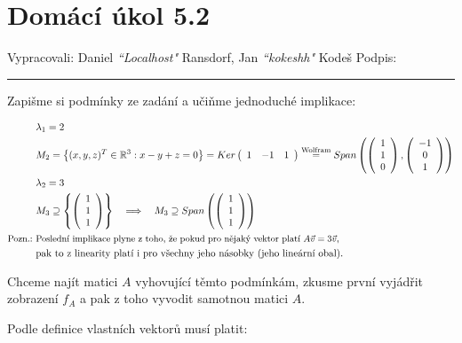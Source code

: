 \documentclass[12pt]{article}
\begin{document}
\section*{Domácí úkol 5.2}

Vypracovali: Daniel \textit{``Localhost"} Ransdorf, Jan \textit{``kokeshh"} Kodeš \hfill Podpis: \rule{4cm}{0.4pt}


\bigskip

Zapišme si podmínky ze zadání a učiňme jednoduché implikace:

\begin{align*}
  &\lambda_1 = 2 \\
  &M_2 = \left\{(x,y,z)^T \in \mathbb{R}^3 : x-y+z=0\right\} = Ker\left(\begin{array}{ccc}
    1&-1&1
  \end{array}\right) \overset{\text{Wolfram}}{=} Span\left(\left(\begin{array}{c}
    1\\1\\0
  \end{array}\right),\left(\begin{array}{c}
    -1\\0\\1
  \end{array}\right)\right) \\
  &\lambda_2 = 3 \\
  &M_3 \supseteq \left\{\left(\begin{array}{c}
    1\\1\\1
  \end{array}\right)\right\}
  \quad \Longrightarrow \quad
  M_3 \supseteq Span\left(\left(\begin{array}{c}
    1\\1\\1
  \end{array}\right)\right) \\
  \text{\small Pozn.:}\ &\text{\small Poslední implikace plyne z toho, že pokud pro nějaký vektor platí
    $A\vec{v} = 3\vec{v}$,}\\
    &\text{pak to z linearity platí i pro všechny jeho násobky (jeho lineární obal).}
\end{align*}

Chceme najít matici $A$ vyhovující těmto podmínkám, zkusme první vyjádřit zobrazení $f_A$
a pak z toho vyvodit samotnou matici $A$.

Podle definice vlastních vektorů musí platit:
\end{document}

